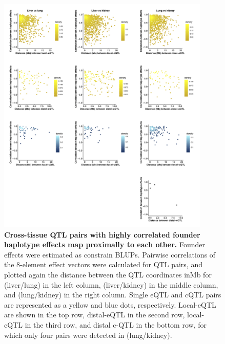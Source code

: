 \documentclass[10pt,letterpaper,twoside]{article}
\begin{document}
\begin{figure}[hp]
\renewcommand{\familydefault}{\sfdefault}\normalfont
\centering
\includegraphics[width=0.9\textwidth, trim={0in 0in 0in 0in}, clip]{figs/effect_size_cor_by_dist.png}
\caption{\textbf{Cross-tissue QTL pairs with highly correlated founder haplotype effects map proximally to each other.} 
Founder effects were estimated as constrain BLUPs. Pairwise correlations of the 8-element effect vectors were calculated for QTL pairs, and plotted again the distance between the QTL coordinates inMb for (liver/lung) in the left column, (liver/kidney) in the middle column, and (lung/kidney) in the right column. Single eQTL and cQTL pairs are represented as a yellow and blue dots, respectively. Local-eQTL are shown in the top row, distal-eQTL in the second row, local-cQTL in the third row, and distal c-QTL in the bottom row, for which only four pairs were detected in (lung/kidney).
\label{fig:qtl_cor_by_distance_comparison}}
\end{figure}

\clearpage
\end{document}
